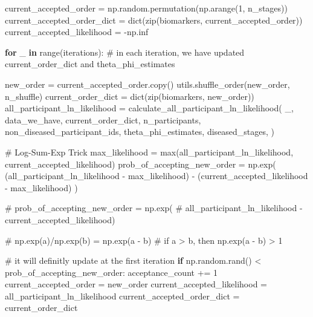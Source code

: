 \documentclass[
  letterpaper,
  DIV=11,
  numbers=noendperiod]{scrreprt}
\newenvironment{Shaded}{\begin{snugshade}}{\end{snugshade}}
\newcommand{\BuiltInTok}[1]{\textcolor[rgb]{0.00,0.23,0.31}{#1}}
\newcommand{\CommentTok}[1]{\textcolor[rgb]{0.37,0.37,0.37}{#1}}
\newcommand{\ControlFlowTok}[1]{\textcolor[rgb]{0.00,0.23,0.31}{\textbf{#1}}}
\newcommand{\DecValTok}[1]{\textcolor[rgb]{0.68,0.00,0.00}{#1}}
\newcommand{\KeywordTok}[1]{\textcolor[rgb]{0.00,0.23,0.31}{\textbf{#1}}}
\newcommand{\NormalTok}[1]{\textcolor[rgb]{0.00,0.23,0.31}{#1}}
\newcommand{\OperatorTok}[1]{\textcolor[rgb]{0.37,0.37,0.37}{#1}}
\begin{document}
\begin{Shaded}
\begin{Highlighting}[]
\NormalTok{    current\_accepted\_order }\OperatorTok{=}\NormalTok{ np.random.permutation(np.arange(}\DecValTok{1}\NormalTok{, n\_stages))}
\NormalTok{    current\_accepted\_order\_dict }\OperatorTok{=} \BuiltInTok{dict}\NormalTok{(}\BuiltInTok{zip}\NormalTok{(biomarkers, current\_accepted\_order))}
\NormalTok{    current\_accepted\_likelihood }\OperatorTok{=} \OperatorTok{{-}}\NormalTok{np.inf}

    \ControlFlowTok{for}\NormalTok{ \_ }\KeywordTok{in} \BuiltInTok{range}\NormalTok{(iterations):}
        \CommentTok{\# in each iteration, we have updated current\_order\_dict and theta\_phi\_estimates}

\NormalTok{        new\_order }\OperatorTok{=}\NormalTok{ current\_accepted\_order.copy()}
\NormalTok{        utils.shuffle\_order(new\_order, n\_shuffle)}
\NormalTok{        current\_order\_dict }\OperatorTok{=} \BuiltInTok{dict}\NormalTok{(}\BuiltInTok{zip}\NormalTok{(biomarkers, new\_order))}
\NormalTok{        all\_participant\_ln\_likelihood }\OperatorTok{=}\NormalTok{ calculate\_all\_participant\_ln\_likelihood(}
\NormalTok{                \_,}
\NormalTok{                data\_we\_have,}
\NormalTok{                current\_order\_dict,}
\NormalTok{                n\_participants,}
\NormalTok{                non\_diseased\_participant\_ids,}
\NormalTok{                theta\_phi\_estimates,}
\NormalTok{                diseased\_stages,}
\NormalTok{            )}


        \CommentTok{\# Log{-}Sum{-}Exp Trick}
\NormalTok{        max\_likelihood }\OperatorTok{=} \BuiltInTok{max}\NormalTok{(all\_participant\_ln\_likelihood,}
\NormalTok{                             current\_accepted\_likelihood)}
\NormalTok{        prob\_of\_accepting\_new\_order }\OperatorTok{=}\NormalTok{ np.exp(}
\NormalTok{            (all\_participant\_ln\_likelihood }\OperatorTok{{-}}\NormalTok{ max\_likelihood) }\OperatorTok{{-}}
\NormalTok{            (current\_accepted\_likelihood }\OperatorTok{{-}}\NormalTok{ max\_likelihood)}
\NormalTok{        )}

        \CommentTok{\# prob\_of\_accepting\_new\_order = np.exp(}
        \CommentTok{\#     all\_participant\_ln\_likelihood {-} current\_accepted\_likelihood)}

        \CommentTok{\# np.exp(a)/np.exp(b) = np.exp(a {-} b)}
        \CommentTok{\# if a \textgreater{} b, then np.exp(a {-} b) \textgreater{} 1}

        \CommentTok{\# it will definitly update at the first iteration}
        \ControlFlowTok{if}\NormalTok{ np.random.rand() }\OperatorTok{\textless{}}\NormalTok{ prob\_of\_accepting\_new\_order:}
\NormalTok{            acceptance\_count }\OperatorTok{+=} \DecValTok{1}
\NormalTok{            current\_accepted\_order }\OperatorTok{=}\NormalTok{ new\_order}
\NormalTok{            current\_accepted\_likelihood }\OperatorTok{=}\NormalTok{ all\_participant\_ln\_likelihood}
\NormalTok{            current\_accepted\_order\_dict }\OperatorTok{=}\NormalTok{ current\_order\_dict}


\end{Highlighting}
\end{Shaded}
\end{document}
